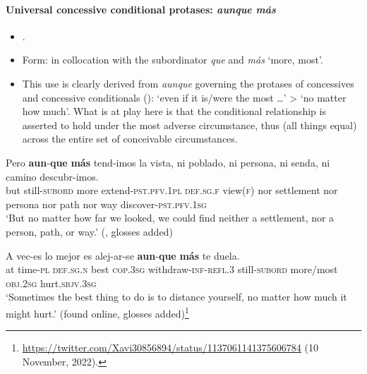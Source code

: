 \paragraph{Universal concessive conditional protases: \textit{aunque más}}\label{appendixSpanishAunAunqueMas}
\begin{itemize}
	\item \textcite[s.v. \textit{aunque}]{RAEDictionary}.
	\item Form: in collocation with the subordinator \textit{que} and \textit{más} \lq more, most'.
	\item This use is clearly derived from \textit{aunque} governing the protases of concessives and concessive conditionals (): \lq even if it is/were the most …\rq{ }> \lq no matter how much\rq{}. What is at play here is that the conditional relationship is asserted to hold under the most adverse circumstance, thus (all things equal) across the entire set of conceivable circumstances.

\end{itemize}
\begin{exe}
	\ex
	\gll Pero \textbf{aun}-\textbf{que} \textbf{más} tend-imos la vista, ni poblado, ni persona, ni senda, ni camino descubr-imos.\\
	but still-\textsc{subord} more extend-\textsc{pst}.\textsc{pfv}.1\textsc{pl} \textsc{def}.\textsc{sg}.\textsc{f} view(\textsc{f}) nor settlement nor persona nor path nor way discover-\textsc{pst}.\textsc{pfv}.1\textsc{sg}\\
	\glt \lq But no matter how far we looked, we could find neither a settlement, nor a person, path, or way.' (\cite[s.v. \textit{aunque}]{RAEDictionary}, glosses added)
	
	\ex
	\gll A vec-es lo mejor es alej-ar-se \textbf{aun}-\textbf{que} \textbf{más} te duela.\\
	at time-\textsc{pl} \textsc{def}.\textsc{sg}.\textsc{n} best \textsc{cop}.3\textsc{sg} withdraw-\textsc{inf}-\textsc{refl}.3 still-\textsc{subord} more/most \textsc{obj}.2\textsc{sg} hurt.\textsc{sbjv}.3\textsc{sg}\\
	\glt \lq Sometimes the best thing to do is to distance yourself, no matter how much it might hurt.\rq{ }(found online, glosses added)\footnote{\url{https://twitter.com/Xavi30856894/status/1137061141375606784} (10 November, 2022).}
\end{exe}

